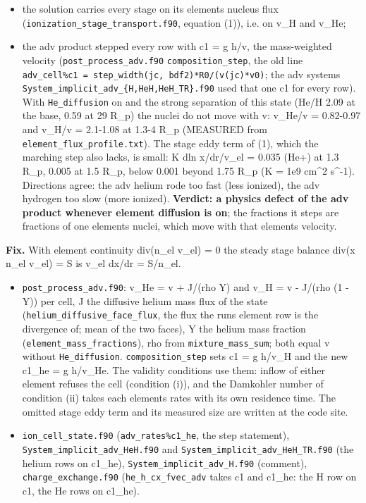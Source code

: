 \documentclass[english,a4paper]{my_memo}
\providecommand{\tightlist}{\setlength{\itemsep}{0pt}\setlength{\parskip}{0pt}}
\begin{document}
\begin{itemize}
\tightlist
\item
  the solution carries every stage on its element\textquotesingle s nucleus flux
  (\texttt{ionization\_stage\_transport.f90}, equation (1)), i.e. on v\_H and v\_He;
\item
  the adv product stepped every row with c1 = g h/v, the mass-weighted
  velocity (\texttt{post\_process\_adv.f90} \texttt{composition\_step}, the old line
  \texttt{adv\_cell\%c1\ =\ step\_width(jc,\ bdf2)*R0/(v(jc)*v0)}; the adv systems
  \texttt{System\_implicit\_adv\_\{H,HeH,HeH\_TR\}.f90} used that one c1 for every row).
  With \texttt{He\_diffusion} on and the strong separation of this state (He/H 2.09
  at the base, 0.59 at 29 R\_p) the nuclei do not move with v: v\_He/v =
  0.82-0.97 and v\_H/v = 2.1-1.08 at 1.3-4 R\_p (MEASURED from
  \texttt{element\_flux\_profile.txt}). The stage eddy term of (1), which the marching
  step also lacks, is small: K \textbar dln x/dr\textbar/v\_el = 0.035 (He+) at 1.3 R\_p,
  0.005 at 1.5 R\_p, below 0.001 beyond 1.75 R\_p (K = 1e9 cm\^{}2 s\^{}-1).
  Directions agree: the adv helium rode too fast (less ionized), the adv
  hydrogen too slow (more ionized). \textbf{Verdict: a physics defect of the adv
  product whenever element diffusion is on}; the fractions it steps are
  fractions of one element\textquotesingle s nuclei, which move with that element\textquotesingle s velocity.
\end{itemize}

\textbf{Fix.} With element continuity div(n\_el v\_el) = 0 the steady stage
balance div(x n\_el v\_el) = S is v\_el dx/dr = S/n\_el.

\begin{itemize}
\tightlist
\item
  \texttt{post\_process\_adv.f90}: v\_He = v + J/(rho Y) and v\_H = v - J/(rho (1 - Y))
  per cell, J the diffusive helium mass flux of the state
  (\texttt{helium\_diffusive\_face\_flux}, the flux the run\textquotesingle s element row is the
  divergence of; mean of the two faces), Y the helium mass fraction
  (\texttt{element\_mass\_fractions}), rho from \texttt{mixture\_mass\_sum}; both equal v
  without \texttt{He\_diffusion}. \texttt{composition\_step} sets c1 = g h/v\_H and the new
  c1\_he = g h/v\_He. The validity conditions use them: inflow of either
  element refuses the cell (condition (i)), and the Damkohler number of
  condition (ii) takes each element\textquotesingle s rates with its own residence time.
  The omitted stage eddy term and its measured size are written at the code
  site.
\item
  \texttt{ion\_cell\_state.f90} (\texttt{adv\_rates\%c1\_he}, the step statement),
  \texttt{System\_implicit\_adv\_HeH.f90} and \texttt{System\_implicit\_adv\_HeH\_TR.f90} (the
  helium rows on c1\_he), \texttt{System\_implicit\_adv\_H.f90} (comment),
  \texttt{charge\_exchange.f90} (\texttt{he\_h\_cx\_fvec\_adv} takes c1 and c1\_he: the H row
  on c1, the He rows on c1\_he).
\end{itemize}
\end{document}
